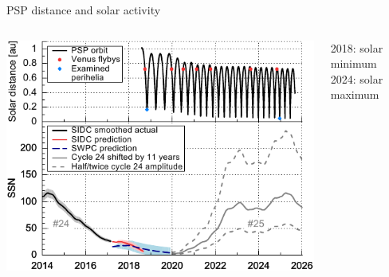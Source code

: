 \begin{frame}[plain,c]{PSP distance and solar activity}{}
	\begin{columns}[c]
		
		\includegraphics[width=\textwidth]{../figures_paper/SPP_orbit_predicted_SSN_overview_f_plot.pdf}

		
		2018: solar minimum\\
		2024: solar maximum

	\end{columns}
\end{frame}

